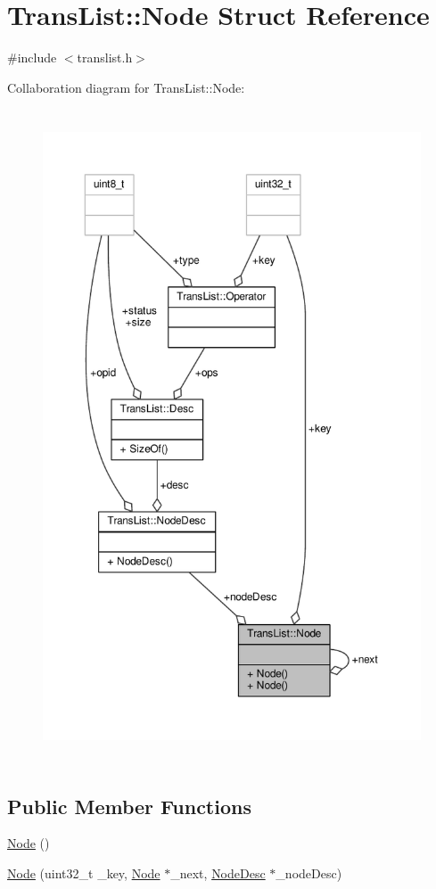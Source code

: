 \hypertarget{structTransList_1_1Node}{\section{Trans\-List\-:\-:Node Struct Reference}
\label{structTransList_1_1Node}
}


{\ttfamily \#include $<$translist.\-h$>$}



Collaboration diagram for Trans\-List\-:\-:Node\-:
\nopagebreak
\begin{figure}[H]
\begin{center}
\leavevmode
\includegraphics[height=550pt]{structTransList_1_1Node__coll__graph}
\end{center}
\end{figure}
\subsection*{Public Member Functions}
\begin{DoxyCompactItemize}
\item 
\hyperlink{structTransList_1_1Node_a302c971f4656befebba47605e21757a1}{Node} ()
\item 
\hyperlink{structTransList_1_1Node_ab6d9f2f978a4cd112d71dd17bbb0d692}{Node} (uint32\-\_\-t \-\_\-key, \hyperlink{structTransList_1_1Node}{Node} $\ast$\-\_\-next, \hyperlink{structTransList_1_1NodeDesc}{Node\-Desc} $\ast$\-\_\-node\-Desc)
\end{DoxyCompactItemize}
